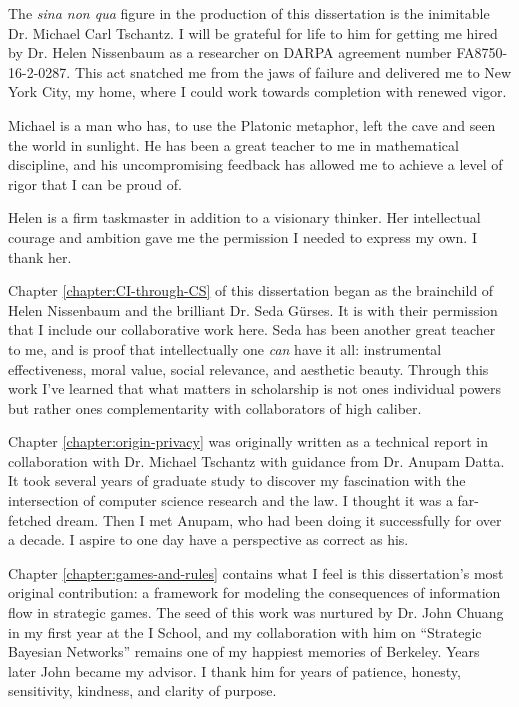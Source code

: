 \documentclass[../thesis.tex]{subfiles}
\begin{document}
 The \textit{sina non qua} figure in the production of
 this dissertation is the inimitable Dr. Michael Carl Tschantz.
 I will be grateful for life to him for getting me hired by
 Dr. Helen Nissenbaum as a researcher on DARPA agreement number FA8750-16-2-0287.
 This act snatched me from the jaws of failure and delivered me
 to New York City, my home, where I could work towards completion with renewed vigor.

 Michael is a man who has, to use the Platonic metaphor,
 left the cave and seen the world in sunlight.
 He has been a great teacher to me in mathematical discipline,
 and his uncompromising feedback has allowed me to
 achieve a  level of rigor that I can be proud of.

 Helen is a firm taskmaster in addition to a visionary thinker.
 Her intellectual courage and ambition gave me the permission I needed to express my own.
 I thank her.
 
 Chapter \ref{chapter:CI-through-CS} of this dissertation began as the brainchild
 of Helen Nissenbaum and the brilliant Dr. Seda G{\"u}rses.
 It is with their permission that I include our collaborative work here.
 Seda has been another great teacher to me,
 and is proof that intellectually
 one \textit{can} have it all:
 instrumental effectiveness, moral value, social relevance,
 and aesthetic beauty.
 Through this work I've learned that what matters in
 scholarship is not ones individual powers but rather
 ones complementarity with collaborators of high caliber.

 Chapter \ref{chapter:origin-privacy} was originally written
 as a technical report in collaboration with Dr. Michael Tschantz
 with guidance from Dr. Anupam Datta.
 It took several years of graduate study to discover my
 fascination with the intersection of computer science
 research and the law.
 I thought it was a far-fetched dream.
 Then I met Anupam,
 who had been doing it successfully for over a decade.
 I aspire to one day have a perspective as correct as his.

 Chapter \ref{chapter:games-and-rules} contains what I feel
 is this dissertation's most original contribution:
 a framework for modeling the consequences of information flow
 in strategic games.
 The seed of this work was nurtured by Dr. John Chuang
 in my first year at the I School, and my collaboration
 with him on ``Strategic Bayesian Networks'' remains one of
 my happiest memories of Berkeley.
 Years later John became my advisor.
 I thank him for years of patience, honesty, sensitivity,
 kindness, and clarity of purpose.
\end{document}
